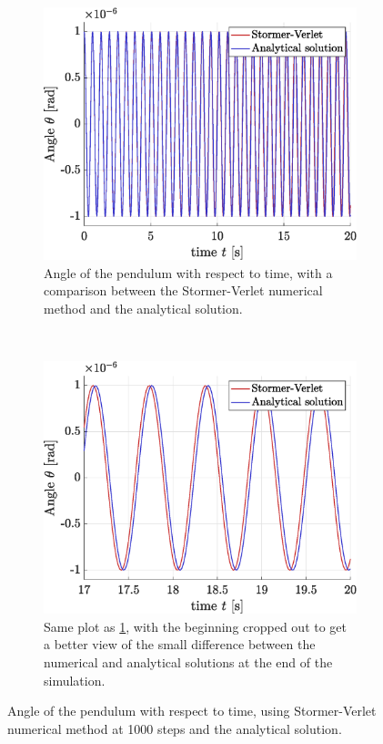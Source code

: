 \documentclass[a4paper,12pt,twoside]{article}
\begin{document}
\begin{figure}[h]
\centering
\begin{subfigure}[t]{0.45\textwidth}
	\includegraphics[width=\textwidth]{graphs/a_traj_full.eps}
	\caption{Angle of the pendulum with respect to time, with a comparison between the Stormer-Verlet numerical method and the analytical solution.}
	\label{fig:a-traj-full}
\end{subfigure}
~
\begin{subfigure}[t]{0.45\textwidth}
	\includegraphics[width=\textwidth]{graphs/a_traj_zoomed.eps}
	\caption{Same plot as \ref{fig:a-traj-full}, with the beginning cropped out to get a better view of the small difference between the numerical and analytical solutions at the end of the simulation.}
	\label{fig:a-traj-zoomed}
\end{subfigure}
\caption{Angle of the pendulum with respect to time, using Stormer-Verlet numerical method at \num{1000} steps and the analytical solution.}
\label{fig:a-traj}
\end{figure}
\end{document}
